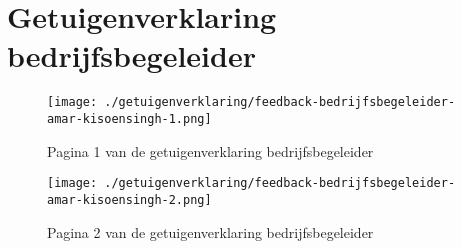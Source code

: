 \section{Getuigenverklaring bedrijfsbegeleider}\label{appendix:Getuigenverklaring-bedrijfsbegeleider}

\begin{figure}[hbt!]
  \centering
  \texttt{[image: ./getuigenverklaring/feedback-bedrijfsbegeleider-amar-kisoensingh-1.png]}
  \caption{Pagina 1 van de getuigenverklaring bedrijfsbegeleider}
  \label{fig:erd}
\end{figure}

\clearpage

\begin{figure}[hbt!]
  \centering
  \texttt{[image: ./getuigenverklaring/feedback-bedrijfsbegeleider-amar-kisoensingh-2.png]}
  \caption{Pagina 2 van de getuigenverklaring bedrijfsbegeleider}
  \label{fig:erd}
\end{figure}

\newpage